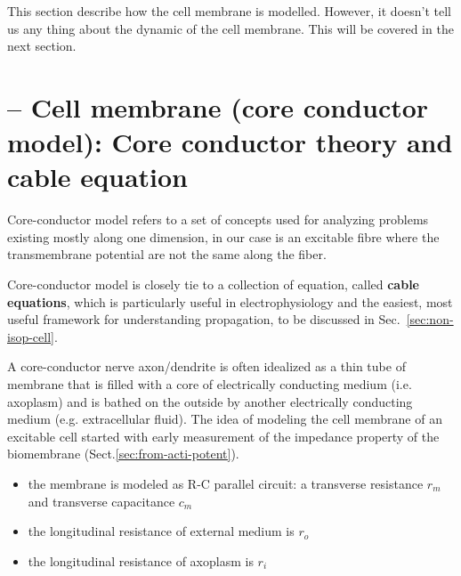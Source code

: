 This section describe how the cell membrane is modelled. However, it doesn't
tell us any thing about the dynamic of the cell membrane. This will be covered
in the next section.

\section{-- Cell membrane (core conductor model): Core conductor theory and
cable equation}
\label{sec:core-conductor-model}
\label{sec:core-conductor-membrane}

Core-conductor model refers to a set of concepts used for analyzing
problems existing mostly along one dimension, in our case is an excitable
fibre where the transmembrane potential are not the same along the fiber. 

Core-conductor model is closely tie to a collection of equation,
called {\bf cable equations}, which is particularly useful in
electrophysiology and the easiest, most useful framework for
understanding propagation, to be discussed in Sec.~\ref{sec:non-isop-cell}.

A core-conductor nerve axon/dendrite is often idealized as a thin tube of
membrane that is filled with a core of electrically conducting medium (i.e.
axoplasm) and is bathed on the outside by another electrically conducting medium
(e.g. extracellular fluid). The idea of modeling the cell membrane of an
excitable cell started with early measurement of the impedance property of the
biomembrane (Sect.\ref{sec:from-acti-potent}).
\begin{itemize}
  \item the membrane is modeled as R-C parallel circuit: a transverse resistance
  $r_m$ and transverse capacitance $c_m$
  
  \item the longitudinal resistance of external medium is $r_o$
  \item the longitudinal resistance of axoplasm is $r_i$
\end{itemize}

